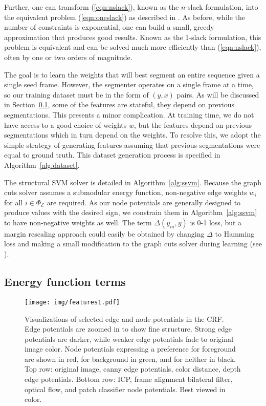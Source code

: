 \documentclass[journal]{IEEEtran}
\begin{document}
Further, one can transform (\ref{eqn:nslack}), known as the $n$-slack formulation, into the equivalent problem (\ref{eqn:oneslack}) as described in \cite{joachims2009a}.  As before, while the number of constraints is exponential, one can build a small, greedy approximation that produces good results.  Known as the 1-slack formulation, this problem is equivalent and can be solved much more efficiently than (\ref{eqn:nslack}), often by one or two orders of magnitude.


The goal is to learn the weights that will best segment an entire sequence given a single seed frame.  However, the segmenter operates on a single frame at a time, so our training dataset must be in the form of $(y, x)$ pairs. As will be discussed in Section~\ref{sec:energy}, some of the features are stateful, \ie they depend on previous segmentations.  This presents a minor complication.  At training time, we do not have access to a good choice of weights $w$, but the features depend on previous segmentations which in turn depend on the weights.  To resolve this, we adopt the simple strategy of generating features assuming that previous segmentations were equal to ground truth.  This dataset generation process is specified in Algorithm~\ref{alg:dataset}.

The structural SVM solver is detailed in Algorithm~\ref{alg:ssvm}.  Because the graph cuts solver assumes a submodular energy function, non-negative edge weights $w_i$ for all $i \in \Phi_{\mathcal{E}}$ are required.  As our node potentials are generally designed to produce values with the desired sign, we constrain them in Algorithm~\ref{alg:ssvm} to have non-negative weights as well.  The term $\Delta (y_m, y)$ is 0-1 loss, but a margin rescaling approach could easily be obtained by changing $\Delta$ to Hamming loss and making a small modification to the graph cuts solver during learning (see \cite{szummer2008a}). 

\subsection{Energy function terms}
\label{sec:energy}

\begin{figure*}
  \centering
  \texttt{[image: img/features1.pdf]}
  \caption{Visualizations of selected edge and node potentials in the CRF.  Edge potentials are zoomed in to show fine structure.  Strong edge potentials are darker, while weaker edge potentials fade to original image color.  Node potentials expressing a preference for foreground are shown in red, for background in green, and for neither in black.  Top row: original image, canny edge potentials, color distance, depth edge potentials.  Bottom row: ICP, frame alignment bilateral filter, optical flow, and patch classifier node potentials.  Best viewed in color.}
  \label{fig:features}
\end{figure*}
\end{document}
